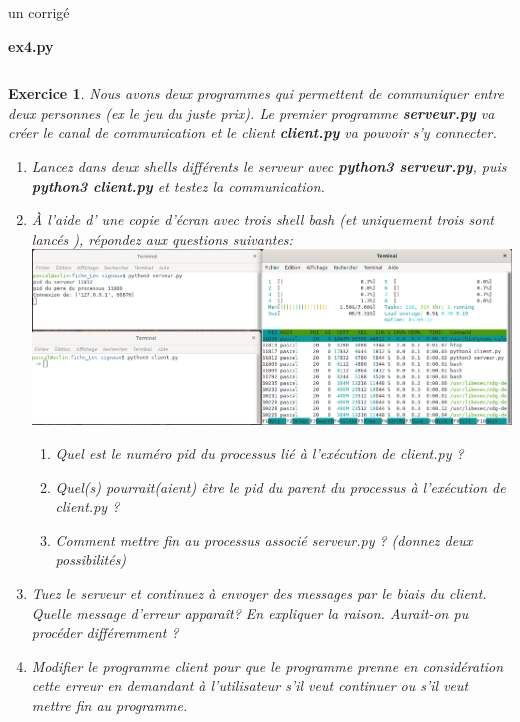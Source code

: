 \documentclass[9pt]{beamer}
\newenvironment{code}[1]{%
    \begin{bclogo}[couleur=backcolour, couleurTexte=black ,couleurBord=bleulapis ,couleurBarre=black, ombre=false,epBord=0.9,logo=\#,arrondi=0.1]{{\bfseries #1}}%
    }%
    {%
    \end{bclogo}
}%
\newtheorem{exercise}{Exercice}
\begin{document}
\begin{frame}[plain]{un corrigé}
\begin{code}{ex4.py}
    \inputminted[fontsize=\scriptsize]{Python}{ex4.py}
\end{code}
\end{frame}
\begin{frame}
\begin{exercise}
 Nous avons deux programmes qui permettent de communiquer entre deux personnes (ex le jeu du juste prix). Le premier programme \textbf{serveur.py} va créer le canal de communication et le client \textbf{client.py} va pouvoir s'y connecter.
\begin{enumerate}
    \item Lancez dans deux shells différents le serveur avec \textbf{python3 serveur.py}, puis \textbf{python3 client.py} et testez la communication.
    \item À l'aide d' une copie d'écran avec trois shell bash (et uniquement trois sont lancés ), répondez aux questions suivantes:  
    \includegraphics[width=0.5\linewidth]{bash_3x}
    \begin{enumerate}
        \item  Quel est le numéro pid du processus lié à  l'exécution de client.py ?    
        \item Quel(s) pourrait(aient) être le pid du parent du processus à  l'exécution de client.py ?
        \item Comment mettre fin au  processus associé serveur.py ? (donnez deux possibilités)       
    \end{enumerate}
    \item Tuez le serveur et continuez à envoyer des messages par le biais du client. Quelle message d'erreur apparaît? En expliquer la raison.
    Aurait-on pu procéder différemment ?
    \item Modifier le programme client pour que le programme prenne en considération cette erreur en demandant à l'utilisateur s'il veut continuer ou s'il veut mettre fin au programme.
\end{enumerate}
\end{exercise}

\end{frame}
\end{document}
